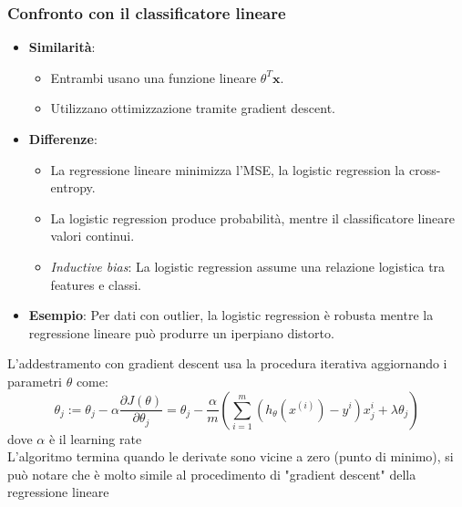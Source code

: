 \documentclass[10pt,oneside,a4paper]{article}
\begin{document}
	\subsubsection{Confronto con il classificatore lineare}
	\begin{itemize}
		\item \textbf{Similarità}:
		\begin{itemize}
			\item Entrambi usano una funzione lineare $\theta^T \mathbf{x}$.
			\item Utilizzano ottimizzazione tramite gradient descent.
		\end{itemize}
		\item \textbf{Differenze}:
		\begin{itemize}
			\item La regressione lineare minimizza l'MSE, la logistic regression la cross-entropy.
			\item La logistic regression produce probabilità, mentre il classificatore lineare valori continui.
			\item \textit{Inductive bias}: La logistic regression assume una relazione logistica tra features e classi.
		\end{itemize}
		\item \textbf{Esempio}: Per dati con outlier, la logistic regression è robusta mentre la regressione lineare può produrre un iperpiano distorto.
	\end{itemize}
	
	L'addestramento con gradient descent usa la procedura iterativa aggiornando i parametri $\theta$ come:
	\[
	\theta_j := \theta_j - \alpha \frac{\partial J(\theta)}{\partial \theta_j} = \theta_j - \frac{\alpha}{m} (\sum_{i=1}^{m} (h_{\theta}(x^{(i)}) - y^i)x_j^i + \lambda \theta_j)
	\]
	dove $\alpha$ è il learning rate\\
	L'algoritmo termina quando le derivate sono vicine a zero (punto di minimo), si può notare che è molto simile al procedimento di "gradient descent" della regressione lineare
	
	
	
\end{document}
